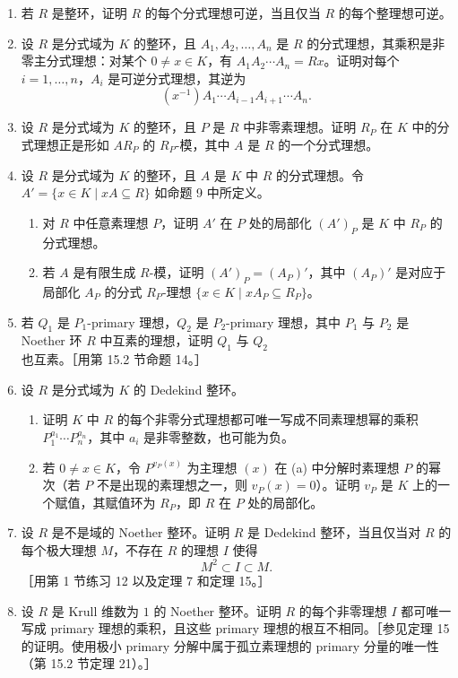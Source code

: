 \begin{enumerate}[label=\arabic*.]
  \item 若 $R$ 是整环，证明 $R$ 的每个分式理想可逆，当且仅当 $R$ 的每个整理想可逆。
  \item 设 $R$ 是分式域为 $K$ 的整环，且 $A_1,A_2,
  \ldots,A_n$ 是 $R$ 的分式理想，其乘积是非零主分式理想：对某个 $0\neq x\in K$，有 $A_1A_2\cdots A_n=Rx$。证明对每个 $i=1,
  \ldots,n$，$A_i$ 是可逆分式理想，其逆为
  \[
    (x^{-1})A_1\cdots A_{i-1}A_{i+1}\cdots A_n.
  \]
  \item 设 $R$ 是分式域为 $K$ 的整环，且 $P$ 是 $R$ 中非零素理想。证明 $R_P$ 在 $K$ 中的分式理想正是形如 $AR_P$ 的 $R_P$-模，其中 $A$ 是 $R$ 的一个分式理想。
  \item 设 $R$ 是分式域为 $K$ 的整环，且 $A$ 是 $K$ 中 $R$ 的分式理想。令 $A'=\{x\in K\mid xA\subseteq R\}$ 如命题 9 中所定义。
  \begin{enumerate}[label=(\alph*)]
    \item 对 $R$ 中任意素理想 $P$，证明 $A'$ 在 $P$ 处的局部化 $(A')_P$ 是 $K$ 中 $R_P$ 的分式理想。
    \item 若 $A$ 是有限生成 $R$-模，证明 $(A')_P=(A_P)'$，其中 $(A_P)'$ 是对应于局部化 $A_P$ 的分式 $R_P$-理想 $\{x\in K\mid xA_P\subseteq R_P\}$。
  \end{enumerate}
  \item 若 $Q_1$ 是 $P_1$-primary 理想，$Q_2$ 是 $P_2$-primary 理想，其中 $P_1$ 与 $P_2$ 是 Noether 环 $R$ 中互素的理想，证明 $Q_1$ 与 $Q_2$ 也互素。［用第 15.2 节命题 14。］
  \item 设 $R$ 是分式域为 $K$ 的 Dedekind 整环。
  \begin{enumerate}[label=(\alph*)]
    \item 证明 $K$ 中 $R$ 的每个非零分式理想都可唯一写成不同素理想幂的乘积 $P_1^{a_1}\cdots P_n^{a_n}$，其中 $a_i$ 是非零整数，也可能为负。
    \item 若 $0\neq x\in K$，令 $P^{v_P(x)}$ 为主理想 $(x)$ 在 (a) 中分解时素理想 $P$ 的幂次（若 $P$ 不是出现的素理想之一，则 $v_P(x)=0$）。证明 $v_P$ 是 $K$ 上的一个赋值，其赋值环为 $R_P$，即 $R$ 在 $P$ 处的局部化。
  \end{enumerate}
  \item 设 $R$ 是不是域的 Noether 整环。证明 $R$ 是 Dedekind 整环，当且仅当对 $R$ 的每个极大理想 $M$，不存在 $R$ 的理想 $I$ 使得
  \[
    M^2\subset I\subset M.
  \]
  ［用第 1 节练习 12 以及定理 7 和定理 15。］
  \item 设 $R$ 是 Krull 维数为 $1$ 的 Noether 整环。证明 $R$ 的每个非零理想 $I$ 都可唯一写成 primary 理想的乘积，且这些 primary 理想的根互不相同。［参见定理 15 的证明。使用极小 primary 分解中属于孤立素理想的 primary 分量的唯一性（第 15.2 节定理 21）。］

\end{enumerate}
